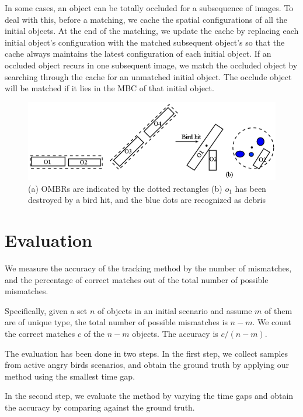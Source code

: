 \documentclass[letterpaper]{article}
\begin{document}
In some cases, an object can be totally occluded for a subsequence of images. To deal with this, before a matching, we cache the spatial configurations of all the initial objects. At the end of the matching, we update the cache by replacing each initial object's configuration with the matched subsequent object's so that the cache always maintains the latest configuration of each initial object. If an occluded object recurs in one subsequent image, we match the occluded object by searching through the cache for an unmatched initial object. The occlude object will be matched if it lies in the MBC of that initial object. 


\begin{figure}[h!]
\centering\includegraphics[scale=0.3]{OMBRs.png}\caption{(a) OMBRs are indicated by the dotted rectangles (b) $o_1$ has been destroyed by a bird hit, and the blue dots are recognized as debris}  
\label{OMBRs}
\end{figure}


  
\section{Evaluation}

We measure the accuracy of the tracking method by the number of mismatches, and the percentage of correct matches out of the total number of possible mismatches. 

Specifically, given a set $n$ of objects in an initial scenario and assume $m$ of them are of unique type, the total number of possible mismatches is $n - m$. We count the correct matches $c$ of the $n - m$ objects. The accuracy is  $c / (n - m)$.


The evaluation has been done in two steps. In the first step, we collect samples from active angry birds scenarios, and obtain the ground truth by applying our method using the smallest time gap.

In the second step, we evaluate the method by varying the time gaps and obtain the accuracy by comparing against the ground truth.
\end{document}
